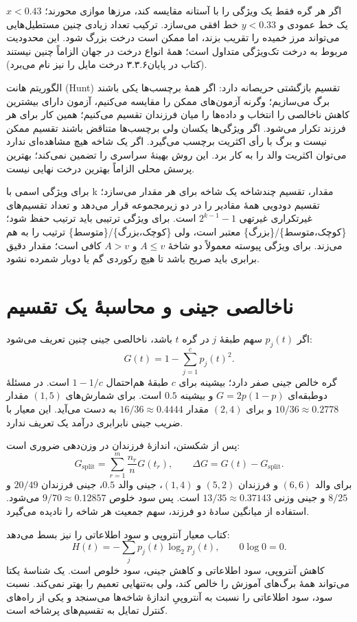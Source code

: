 اگر هر گره فقط یک ویژگی را با آستانه مقایسه کند، مرزها موازی محورند؛ $x<0.43$ یک خط عمودی و $y<0.33$ خط افقی می‌سازد. ترکیب تعداد زیادی چنین مستطیل‌هایی می‌تواند مرز خمیده را تقریب بزند، اما ممکن است درخت بزرگ شود. این محدودیت مربوط به درخت تک‌ویژگی متداول است؛ همهٔ انواع درخت در جهان الزاماً چنین نیستند (کتاب در پایان۳.۳.۶ درخت مایل را نیز نام می‌برد).

الگوریتم هانت (Hunt) تقسیم بازگشتی حریصانه دارد: اگر همهٔ برچسب‌ها یکی باشند برگ می‌سازیم؛ وگرنه آزمون‌های ممکن را مقایسه می‌کنیم، آزمون دارای بیشترین کاهش ناخالصی را انتخاب و داده‌ها را میان فرزندان تقسیم می‌کنیم؛ همین کار برای هر فرزند تکرار می‌شود. اگر ویژگی‌ها یکسان ولی برچسب‌ها متناقض باشند تقسیم ممکن نیست و برگ با رأی اکثریت برچسب می‌گیرد. اگر یک شاخه هیچ مشاهده‌ای ندارد می‌توان اکثریت والد را به کار برد. این روش بهینهٔ سراسری را تضمین نمی‌کند؛ بهترین پرسش محلی الزاماً بهترین درخت نهایی نیست.

برای ویژگی اسمی با k مقدار، تقسیم چندشاخه یک شاخه برای هر مقدار می‌سازد؛ تقسیم دودویی همهٔ مقادیر را در دو زیرمجموعه قرار می‌دهد و تعداد تقسیم‌های غیرتکراری غیرتهی $2^{k-1}-1$ است. برای ویژگی ترتیبی باید ترتیب حفظ شود؛ \{کوچک،متوسط\}/\{بزرگ\} معتبر است، ولی \{کوچک،بزرگ\}/\{متوسط\} ترتیب را به هم می‌زند. برای ویژگی پیوسته معمولاً دو شاخهٔ $A\le v$ و $A>v$ کافی است؛ مقدار دقیق برابری باید صریح باشد تا هیچ رکوردی گم یا دوبار شمرده نشود.

\section{ناخالصی جینی و محاسبهٔ یک تقسیم}

اگر $p_j(t)$ سهم طبقهٔ $j$ در گره $t$ باشد، ناخالصی جینی چنین تعریف می‌شود:
\[G(t)=1-\sum_{j=1}^c p_j(t)^2.\]
گره خالص جینی صفر دارد؛ بیشینه برای $c$ طبقهٔ هم‌احتمال $1-1/c$ است. در مسئلهٔ دوطبقه‌ای $G=2p(1-p)$ و بیشینه $0.5$ است. برای شمارش‌های $(1,5)$ مقدار $10/36\approx0.2778$ و برای $(2,4)$ مقدار $16/36\approx0.4444$ به دست می‌آید. این معیار با ضریب جینی نابرابری درآمد یک تعریف ندارد.

پس از شکستن، اندازهٔ فرزندان در وزن‌دهی ضروری است:
\[G_{\mathrm{split}}=\sum_{r=1}^m\frac{n_r}{n}G(t_r),\qquad \Delta G=G(t)-G_{\mathrm{split}}.\]
برای والد $(6,6)$ و فرزندان $(5,2)$ و $(1,4)$، جینی والد $0.5$، جینی فرزندان $20/49$ و $8/25$ و جینی وزنی $13/35\approx0.37143$ است. پس سود خلوص $9/70\approx0.12857$ می‌شود. استفاده از میانگین سادهٔ دو فرزند، سهم جمعیت هر شاخه را نادیده می‌گیرد.

کتاب معیار آنتروپی و سود اطلاعاتی را نیز بسط می‌دهد:
\[H(t)=-\sum_j p_j(t)\log_2p_j(t),\qquad 0\log 0=0.\]
کاهش آنتروپی، سود اطلاعاتی و کاهش جینی، سود خلوص است. یک شناسهٔ یکتا می‌تواند همهٔ برگ‌های آموزش را خالص کند، ولی به‌تنهایی تعمیم را بهتر نمی‌کند. نسبت سود، سود اطلاعاتی را نسبت به آنتروپیِ اندازهٔ شاخه‌ها می‌سنجد و یکی از راه‌های کنترل تمایل به تقسیم‌های پرشاخه است.

